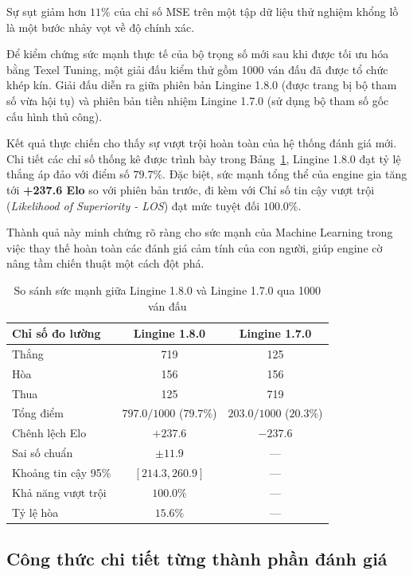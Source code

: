 Sự sụt giảm hơn $11\%$ của chỉ số MSE trên một tập dữ liệu thử nghiệm khổng lồ là một bước nhảy vọt về độ chính xác.

Để kiểm chứng sức mạnh thực tế của bộ trọng số mới sau khi được tối ưu hóa bằng Texel Tuning, một giải đấu kiểm thử gồm 1000 ván đấu đã được tổ chức khép kín. Giải đấu diễn ra giữa phiên bản Lingine 1.8.0 (được trang bị bộ tham số vừa hội tụ) và phiên bản tiền nhiệm Lingine 1.7.0 (sử dụng bộ tham số gốc cấu hình thủ công).

Kết quả thực chiến cho thấy sự vượt trội hoàn toàn của hệ thống đánh giá mới. Chi tiết các chỉ số thống kê được trình bày trong Bảng~\ref{tab:engine_comparison}, Lingine 1.8.0 đạt tỷ lệ thắng áp đảo với điểm số $79.7\%$. Đặc biệt, sức mạnh tổng thể của engine gia tăng tới \textbf{+237.6 Elo} so với phiên bản trước, đi kèm với Chỉ số tin cậy vượt trội (\textit{Likelihood of Superiority - LOS}) đạt mức tuyệt đối $100.0\%$. 

Thành quả này minh chứng rõ ràng cho sức mạnh của Machine Learning trong việc thay thế hoàn toàn các đánh giá cảm tính của con người, giúp engine cờ nâng tầm chiến thuật một cách đột phá.

\begin{table}[htbp]
    \centering
    \begin{tabular}{lcc}
        \hline
        \textbf{Chỉ số đo lường} & \textbf{Lingine 1.8.0} & \textbf{Lingine 1.7.0} \\ \hline
        Thắng & 719 & 125 \\ 
        Hòa & 156 & 156 \\ 
        Thua & 125 & 719 \\ 
        Tổng điểm & $797.0 / 1000$ ($79.7\%$) & $203.0 / 1000$ ($20.3\%$) \\ 
        Chênh lệch Elo & $\mathbf{+237.6}$ & $-237.6$ \\ 
        Sai số chuẩn & $\pm 11.9$ & — \\ 
        Khoảng tin cậy 95\% & $[214.3, 260.9]$ & — \\ 
        Khả năng vượt trội & $100.0\%$ & — \\ 
        Tỷ lệ hòa & $15.6\%$ & — \\ \hline
    \end{tabular}
    \caption{So sánh sức mạnh giữa Lingine 1.8.0 và Lingine 1.7.0 qua 1000 ván đấu}
    \label{tab:engine_comparison}
\end{table}

\subsection{Công thức chi tiết từng thành phần đánh giá}

